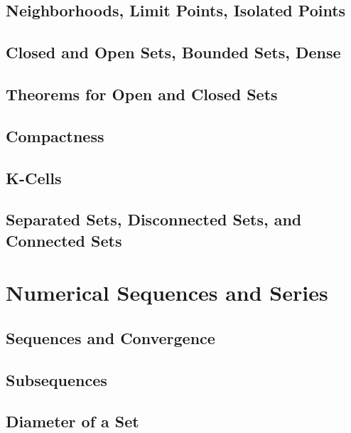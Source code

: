 \documentclass[a4paper, openany]{book}
\begin{document}
\section{Neighborhoods, Limit Points, Isolated Points}

\newpage

\section{Closed and Open Sets, Bounded Sets, Dense}

\newpage

\section{Theorems for Open and Closed Sets}

\newpage

\section{Compactness}

\newpage

\section{K-Cells}

\newpage

\section{Separated Sets, Disconnected Sets, and Connected Sets}

\newpage

\chapter{Numerical Sequences and Series}
\section{Sequences and Convergence}

\newpage

\section{Subsequences}

\newpage

\section{Diameter of a Set}

\newpage
\end{document}
